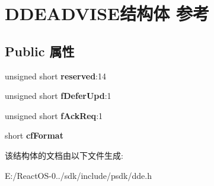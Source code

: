 \hypertarget{struct_d_d_e_a_d_v_i_s_e}{}\section{D\+D\+E\+A\+D\+V\+I\+S\+E结构体 参考}
\label{struct_d_d_e_a_d_v_i_s_e}
\subsection*{Public 属性}
\begin{DoxyCompactItemize}
\item 
\mbox{\label{struct_d_d_e_a_d_v_i_s_e_addaea15f8d8118078403a2a9f155d430}} 
unsigned short {\bfseries reserved}\+:14
\item 
\mbox{\label{struct_d_d_e_a_d_v_i_s_e_a9433e78c6cd4f2eab3dd4897aa1ec5f9}} 
unsigned short {\bfseries f\+Defer\+Upd}\+:1
\item 
\mbox{\label{struct_d_d_e_a_d_v_i_s_e_a64d68358f55b671099ca03c8837a31af}} 
unsigned short {\bfseries f\+Ack\+Req}\+:1
\item 
\mbox{\label{struct_d_d_e_a_d_v_i_s_e_a4104e6d465a8e5a46b4936050e84e0b5}} 
short {\bfseries cf\+Format}
\end{DoxyCompactItemize}


该结构体的文档由以下文件生成\+:\begin{DoxyCompactItemize}
\item 
E\+:/\+React\+O\+S-\/0../sdk/include/psdk/dde.\+h\end{DoxyCompactItemize}
